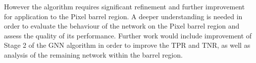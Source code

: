 However the algorithm requires significant refinement and further improvement for application to the Pixel barrel region. A deeper understanding is needed in order to evaluate the behaviour of the network on the Pixel barrel region and assess the quality of its performance. Further work would include improvement of Stage 2 of the GNN algorithm in order to improve the TPR and TNR, as well as analysis of the remaining network within the barrel region.
